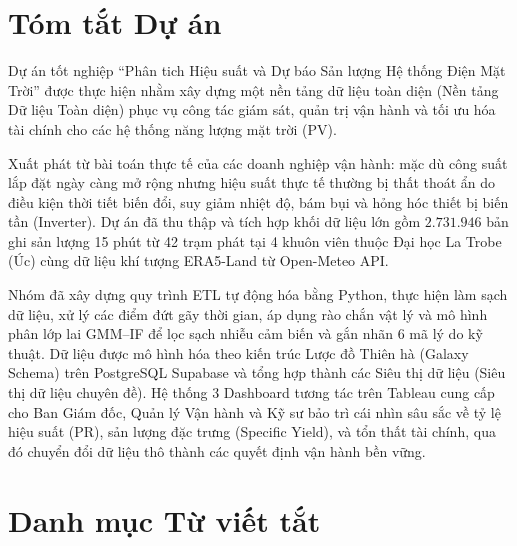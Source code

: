 \documentclass[12pt, a4paper]{report}
\begin{document}
\chapter*{Tóm tắt Dự án}
Dự án tốt nghiệp ``Phân tich Hiệu suất và Dự báo Sản lượng Hệ thống Điện Mặt Trời'' được thực hiện nhằm xây dựng một nền tảng dữ liệu toàn diện (Nền tảng Dữ liệu Toàn diện) phục vụ công tác giám sát, quản trị vận hành và tối ưu hóa tài chính cho các hệ thống năng lượng mặt trời (PV). 

Xuất phát từ bài toán thực tế của các doanh nghiệp vận hành: mặc dù công suất lắp đặt ngày càng mở rộng nhưng hiệu suất thực tế thường bị thất thoát ẩn do điều kiện thời tiết biến đổi, suy giảm nhiệt độ, bám bụi và hỏng hóc thiết bị biến tần (Inverter). Dự án đã thu thập và tích hợp khối dữ liệu lớn gồm $2.731.946$ bản ghi sản lượng 15 phút từ 42 trạm phát tại 4 khuôn viên thuộc Đại học La Trobe (Úc) cùng dữ liệu khí tượng ERA5-Land từ Open-Meteo API.

Nhóm đã xây dựng quy trình ETL tự động hóa bằng Python, thực hiện làm sạch dữ liệu, xử lý các điểm đứt gãy thời gian, áp dụng rào chắn vật lý và mô hình phân lớp lai GMM--IF để lọc sạch nhiễu cảm biến và gắn nhãn 6 mã lý do kỹ thuật. Dữ liệu được mô hình hóa theo kiến trúc Lược đồ Thiên hà (Galaxy Schema) trên PostgreSQL Supabase và tổng hợp thành các Siêu thị dữ liệu (Siêu thị dữ liệu chuyên đề). Hệ thống 3 Dashboard tương tác trên Tableau cung cấp cho Ban Giám đốc, Quản lý Vận hành và Kỹ sư bảo trì cái nhìn sâu sắc về tỷ lệ hiệu suất (PR), sản lượng đặc trưng (Specific Yield), và tổn thất tài chính, qua đó chuyển đổi dữ liệu thô thành các quyết định vận hành bền vững.

\tableofcontents
\listoffigures
\listoftables

\chapter*{Danh mục Từ viết tắt}
\vspace*{-15pt}
\end{document}
